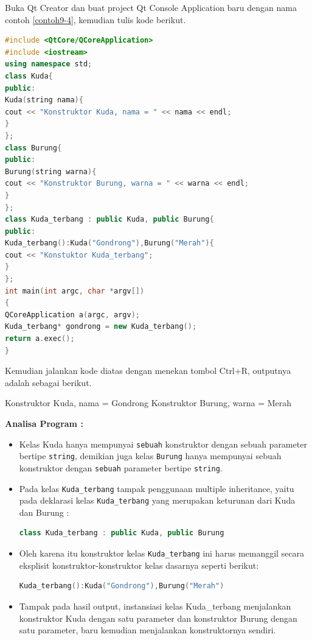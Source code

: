 Buka Qt Creator dan buat project Qt Console Application baru dengan nama
contoh \ref{contoh9-4}, kemudian tulis kode berikut.

\begin{lstlisting}[language=c++, caption=Konstruktor Kelas Multiple Inheritance, label=contoh9-4]
#include <QtCore/QCoreApplication>
#include <iostream>
using namespace std;
class Kuda{
public:
Kuda(string nama){
cout << "Konstruktor Kuda, nama = " << nama << endl;
}
};
class Burung{
public:
Burung(string warna){
cout << "Konstruktor Burung, warna = " << warna << endl;
}
};
class Kuda_terbang : public Kuda, public Burung{
public:
Kuda_terbang():Kuda("Gondrong"),Burung("Merah"){
cout << "Konstuktor Kuda_terbang";
}
};
int main(int argc, char *argv[])
{
QCoreApplication a(argc, argv);
Kuda_terbang* gondrong = new Kuda_terbang();
return a.exec();
}
\end{lstlisting}

Kemudian jalankan kode diatas dengan menekan tombol Ctrl+R, outputnya
adalah sebagai berikut.

\begin{lcverbatim}
Konstruktor Kuda, nama = Gondrong
Konstruktor Burung, warna = Merah
\end{lcverbatim}

\textbf{Analisa Program :}

\begin{itemize}
\item
  Kelas Kuda hanya mempunyai \texttt{sebuah} konstruktor dengan sebuah
  parameter bertipe \texttt{string}, demikian juga kelas \texttt{Burung}
  hanya mempunyai sebuah konstruktor dengan \texttt{sebuah} parameter
  bertipe \texttt{string}.
\item
  Pada kelas \texttt{Kuda\_terbang} tampak penggunaan multiple
  inheritance, yaitu pada deklarasi kelas \texttt{Kuda\_terbang} yang
  merupakan keturunan dari Kuda dan Burung :

\begin{lstlisting}[language=c++, numbers=none]
class Kuda_terbang : public Kuda, public Burung
\end{lstlisting}
\item
  Oleh karena itu konstruktor kelas \texttt{Kuda\_terbang} ini harus
  memanggil secara eksplisit konstruktor-konstruktor kelas dasarnya
  seperti berikut:

\begin{lstlisting}[language=c++, numbers=none]
Kuda_terbang():Kuda("Gondrong"),Burung("Merah")
\end{lstlisting}
\item
  Tampak pada hasil output, instansiasi kelas Kuda\_terbang menjalankan
  konstruktor Kuda dengan satu parameter dan konstruktor Burung dengan
  satu parameter, baru kemudian menjalankan konstruktornya sendiri.
\end{itemize}


